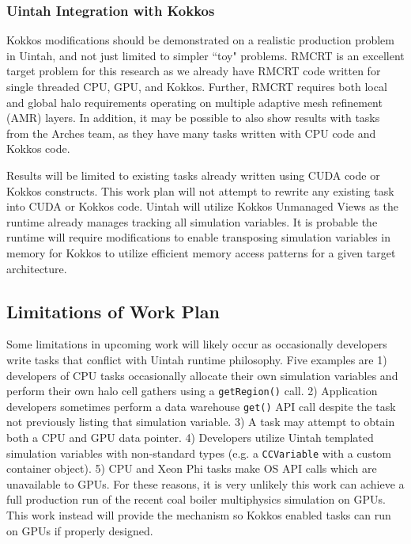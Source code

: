 \documentclass[12pt]{article}
\begin{document}
\subsubsection{Uintah Integration with Kokkos}
\label{ch:workplan-kokkos-integration}

Kokkos modifications should be demonstrated on a realistic production problem in Uintah, and not just limited to simpler ``toy" problems.  RMCRT is an excellent target problem for this research as we already have RMCRT code written for single threaded CPU, GPU, and Kokkos.  Further, RMCRT requires both local and global halo requirements operating on multiple adaptive mesh refinement (AMR) layers.  In addition, it may be possible to also show results with tasks from the Arches team, as they have many tasks written with CPU code and Kokkos code.  

Results will be limited to existing tasks already written using CUDA code or Kokkos constructs.  This work plan will not attempt to rewrite any existing task into CUDA or Kokkos code.  Uintah will utilize Kokkos Unmanaged Views as the runtime already manages tracking all simulation variables.  It is probable the runtime will require modifications to enable transposing simulation variables in memory for Kokkos to utilize efficient memory access patterns for a given target architecture.

\subsection{Limitations of Work Plan}
\label{ch:workplan-limitations}
Some limitations in upcoming work will likely occur as occasionally developers write tasks that conflict with Uintah runtime philosophy.  Five examples are 1) developers of CPU tasks occasionally allocate their own simulation variables and perform their own halo cell gathers using a \texttt{getRegion()} call. 2) Application developers sometimes perform a data warehouse \texttt{get()} API call despite the task not previously listing that simulation variable. 3) A task may attempt to obtain both a CPU and GPU data pointer.  4) Developers utilize Uintah templated simulation variables with non-standard types (e.g. a \texttt{CCVariable} with a custom container object).  5) CPU and Xeon Phi tasks make OS API calls which are unavailable to GPUs.  For these reasons, it is very unlikely this work can achieve a full production run of the recent coal boiler multiphysics simulation on GPUs.  This work instead will provide the mechanism so Kokkos enabled tasks can run on GPUs if properly designed.  
\end{document}
